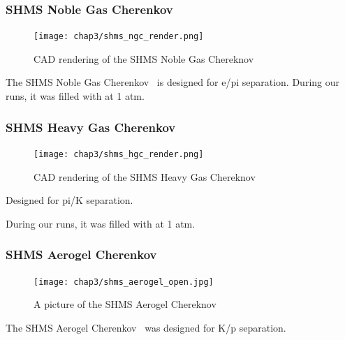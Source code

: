 \subsubsection{SHMS Noble Gas Cherenkov}
\begin{figure}[ht]
    \centering
    \texttt{[image: chap3/shms\_ngc\_render.png]}
    \caption{CAD rendering of the SHMS Noble Gas Chereknov }
    \label{fig:shms_ngcer}
\end{figure}

The SHMS Noble Gas Cherenkov~\cite{NGC_Design_Report} is designed for e/pi
separation.
During our runs, it was filled with  at 1 atm.

\subsubsection{SHMS Heavy Gas Cherenkov}
\begin{figure}[ht]
    \centering
    \texttt{[image: chap3/shms\_hgc\_render.png]}
    \caption{CAD rendering of the SHMS Heavy Gas Chereknov }
    \label{fig:shms_hgcer}
\end{figure}

Designed for pi/K separation.

During our runs, it was filled with  at 1 atm.

\subsubsection{SHMS Aerogel Cherenkov}
\begin{figure}[ht]
    \centering
    \texttt{[image: chap3/shms\_aerogel\_open.jpg]}
    \caption{A picture of the SHMS Aerogel Chereknov }
    \label{fig:shms_aerogel}
\end{figure}

The SHMS Aerogel Cherenkov~\cite{Horn_2017} was designed for K/p separation.


